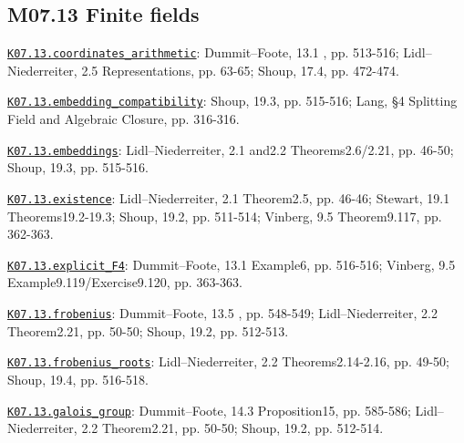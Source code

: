 \subsection*{M07.13 Finite fields}
\par\smallskip\noindent\hypertarget{src:K07.13.coordinates_arithmetic}{}\label{src:K07.13.coordinates_arithmetic}\hyperref[K07.13.coordinates_arithmetic]{\texttt{K07.13.coordinates\_arithmetic}}: Dummit--Foote, 13.1 , pp. 513-516; Lidl--Niederreiter, 2.5 Representations, pp. 63-65; Shoup, 17.4, pp. 472-474.
\par\smallskip\noindent\hypertarget{src:K07.13.embedding_compatibility}{}\label{src:K07.13.embedding_compatibility}\hyperref[K07.13.embedding_compatibility]{\texttt{K07.13.embedding\_compatibility}}: Shoup, 19.3, pp. 515-516; Lang, §4 Splitting Field and Algebraic Closure, pp. 316-316.
\par\smallskip\noindent\hypertarget{src:K07.13.embeddings}{}\label{src:K07.13.embeddings}\hyperref[K07.13.embeddings]{\texttt{K07.13.embeddings}}: Lidl--Niederreiter, 2.1 and2.2 Theorems2.6/2.21, pp. 46-50; Shoup, 19.3, pp. 515-516.
\par\smallskip\noindent\hypertarget{src:K07.13.existence}{}\label{src:K07.13.existence}\hyperref[K07.13.existence]{\texttt{K07.13.existence}}: Lidl--Niederreiter, 2.1 Theorem2.5, pp. 46-46; Stewart, 19.1 Theorems19.2-19.3; Shoup, 19.2, pp. 511-514; Vinberg, 9.5 Theorem9.117, pp. 362-363.
\par\smallskip\noindent\hypertarget{src:K07.13.explicit_F4}{}\label{src:K07.13.explicit_F4}\hyperref[K07.13.explicit_F4]{\texttt{K07.13.explicit\_F4}}: Dummit--Foote, 13.1 Example6, pp. 516-516; Vinberg, 9.5 Example9.119/Exercise9.120, pp. 363-363.
\par\smallskip\noindent\hypertarget{src:K07.13.frobenius}{}\label{src:K07.13.frobenius}\hyperref[K07.13.frobenius]{\texttt{K07.13.frobenius}}: Dummit--Foote, 13.5 , pp. 548-549; Lidl--Niederreiter, 2.2 Theorem2.21, pp. 50-50; Shoup, 19.2, pp. 512-513.
\par\smallskip\noindent\hypertarget{src:K07.13.frobenius_roots}{}\label{src:K07.13.frobenius_roots}\hyperref[K07.13.frobenius_roots]{\texttt{K07.13.frobenius\_roots}}: Lidl--Niederreiter, 2.2 Theorems2.14-2.16, pp. 49-50; Shoup, 19.4, pp. 516-518.
\par\smallskip\noindent\hypertarget{src:K07.13.galois_group}{}\label{src:K07.13.galois_group}\hyperref[K07.13.galois_group]{\texttt{K07.13.galois\_group}}: Dummit--Foote, 14.3 Proposition15, pp. 585-586; Lidl--Niederreiter, 2.2 Theorem2.21, pp. 50-50; Shoup, 19.2, pp. 512-514.
